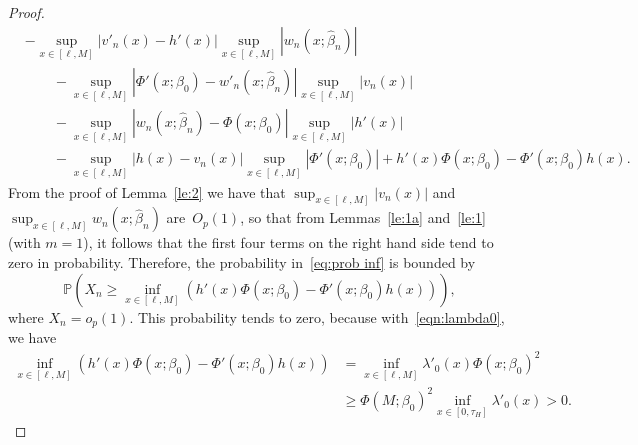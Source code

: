 \documentclass[11pt,reqno]{amsart}
\theoremstyle{definition}
\theoremstyle{plain}
\theoremstyle{remark}
\begin{document}
\begin{proof}
\[\begin{split}
&
-\sup_{x\in[\ell,M]}|v'_n(x)-h'(x)|\sup_{x\in[\ell,M]}|w_n(x;\hat{\beta}_n)|\\
&\qquad-
\sup_{x\in[\ell,M]}|\Phi'(x;\beta_0)-w'_n(x;\hat{\beta}_n)|\sup_{x\in[\ell,M]}|v_n(x)|\\
&\qquad-
\sup_{x\in[\ell,M]}|w_n(x;\hat{\beta}_n)-\Phi(x;\beta_0)|\sup_{x\in[\ell,M]}|h'(x)|\\
&\qquad-
\sup_{x\in[\ell,M]}|h(x)-v_n(x)|\sup_{x\in[\ell,M]}|\Phi'(x;\beta_0)|
+
h'(x)\Phi(x;\beta_0)-\Phi'(x;\beta_0)h(x).
\end{split}
\]
From the proof of Lemma~\ref{le:2} we have that $\sup_{x\in[\ell,M]}|v_n(x)|$ and $\sup_{x\in[\ell,M]}w_n(x;\hat{\beta}_n)$ are~$O_p(1)$,
so that from Lemmas~\ref{le:1a} and~\ref{le:1} (with $m=1$), it follows that the first four terms on the right hand side tend to zero in probability.
Therefore, the probability in~\eqref{eq:prob inf} is bounded by
\[
{\mathbb{P}}
\left(
X_n\geq \inf_{x\in[\ell,M]}
\left(
h'(x)\Phi(x;\beta_0)-\Phi'(x;\beta_0)h(x)
\right)
\right),
\]
where $X_n=o_p(1)$.
This probability tends to zero, because with~\eqref{eqn:lambda0}, we have
\[
\begin{split}
\inf_{x\in[\ell,M]}
\left(
h'(x)\Phi(x;\beta_0)-\Phi'(x;\beta_0)h(x)
\right)
&=
\inf_{x\in[\ell,M]}\lambda'_0(x)\Phi(x;\beta_0)^2\\
&\geq
\Phi(M;\beta_0)^2
\inf_{x\in[0,\tau_H]}\lambda'_0(x)
>0.
\end{split}
\]
\end{proof}
\end{document}
